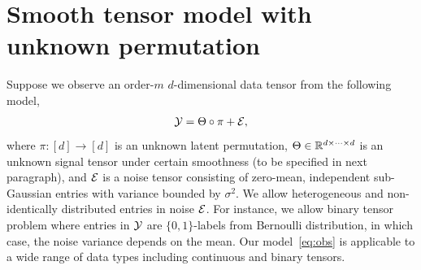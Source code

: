 \documentclass[12pt]{article}
\theoremstyle{definition}
\begin{document}
\section{Smooth tensor model with unknown permutation}\label{sec:model}
Suppose we observe an order-$m$ $d$-dimensional data tensor from the following model,
\begin{equation}\label{eq:obs}
\mathcal{Y}=\Theta\circ \pi+\mathcal{E},
\end{equation}
where $\pi\colon[d]\rightarrow[d]$ is an unknown latent permutation,  $\Theta\in \mathbb{R}^{d\times \cdots \times d}$ is an unknown signal tensor under certain smoothness (to be specified in next paragraph), and $\mathcal{E}$ is a noise tensor consisting of zero-mean, independent sub-Gaussian entries with variance bounded by $\sigma^2$. We allow heterogeneous and non-identically distributed entries in noise $\mathcal{E}$. For instance, we allow binary tensor problem where entries in $\mathcal{Y}$ are $\{0, 1\}$-labels from Bernoulli distribution, in which case, the noise variance depends on the mean. Our model~\eqref{eq:obs} is applicable to a wide range of data types including continuous and binary tensors. 
 
\end{document}
